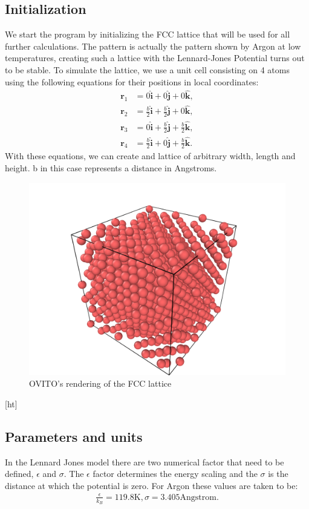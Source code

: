 \documentclass[11pt,twocolumn]{article}
\begin{document}
\subsection{Initialization}
We start the program by initializing the FCC lattice that will be used for all further calculations. The pattern is actually the pattern shown by Argon at low temperatures, creating such a lattice with the Lennard-Jones Potential turns out to be stable. To simulate the lattice, we use a unit cell consisting on 4 atoms using the following equations for their positions in local coordinates:
\begin{align}
	\mathbf{r}_1 &= 0 \hat{\mathbf{i}} + 0 \hat{\mathbf{j}} + 0 \hat{\mathbf{k}},\\
	\mathbf{r}_2 &= \frac{b}{2} \hat{\mathbf{i}} + \frac{b}{2} \hat{\mathbf{j}} + 0 \hat{\mathbf{k}},\\
	\mathbf{r}_3 &= 0 \hat{\mathbf{i}} + \frac{b}{2} \hat{\mathbf{j}} + \frac{b}{2} \hat{\mathbf{k}},\\
	\mathbf{r}_4 &= \frac{b}{2} \hat{\mathbf{i}} + 0 \hat{\mathbf{j}} + \frac{b}{2} \hat{\mathbf{k}}.
\end{align}
With these equations, we can create and lattice of arbitrary width, length and height. b in this case represents a distance in Angstroms.
\begin{figure}[ht]
\includegraphics[width=\columnwidth]{lattice.png}
\caption{OVITO's rendering of the FCC lattice}
\label{ovito}
\end{figure}[ht]
\subsection{Parameters and units}
In the Lennard Jones model there are two numerical factor that need to be defined, $\epsilon$ and $\sigma$. The $\epsilon$ factor determines the energy scaling and the $\sigma$ is the distance at which the potential is zero. For Argon these values are taken to be:
\begin{align}
	\frac{\epsilon}{k_B} = 119.8\mathrm{K},  \sigma=3.405 \mathrm{Angstrom}.
\end{align}
\end{document}
